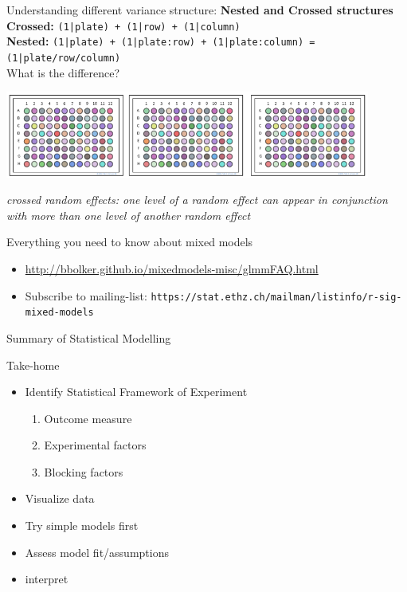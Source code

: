 \documentclass{beamer}
\begin{document}
\begin{frame}{Understanding different variance structure: \textbf{Nested and Crossed structures}} 
\textbf{Crossed:} \texttt{(1|plate) + (1|row) + (1|column)}\\
\vspace{0.2cm}
\textbf{Nested:} \texttt{(1|plate) + (1|plate:row) + (1|plate:column) = (1|plate/row/column)}\\

What is the difference?

 \begin{center}
  \includegraphics[width=0.9\textwidth]{Figures/nestedplates}
 \end{center}

 \textit{crossed random effects: one level of a random effect can appear in conjunction with more than one level of another random effect}
\end{frame}



\begin{frame}{Everything you need to know about mixed models}

\begin{itemize}
 \item \url{http://bbolker.github.io/mixedmodels-misc/glmmFAQ.html}
 \item Subscribe to mailing-list: \texttt{https://stat.ethz.ch/mailman/listinfo/r-sig-mixed-models}
\end{itemize}

\end{frame}


\begin{frame}{Summary of Statistical Modelling}
 \begin{alertblock}{Take-home}
  \begin{itemize}[<+->]
   \item Identify Statistical Framework of Experiment
    \begin{enumerate}
     \item Outcome measure
     \item Experimental factors
     \item Blocking factors
    \end{enumerate}
  \item Visualize data
  \item Try simple models first
  \item Assess model fit/assumptions
  \item interpret
  \end{itemize}

 \end{alertblock}

 
\end{frame}
\end{document}
